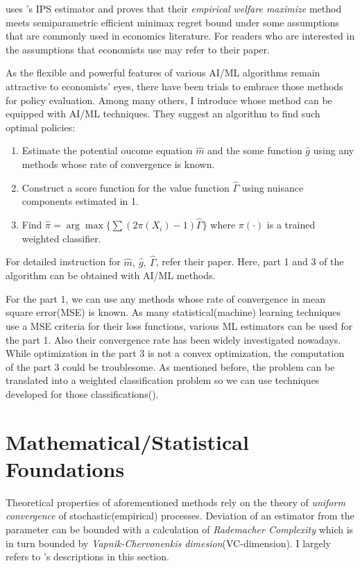 \documentclass[11pt]{article}
\begin{document}
	\cite{Kitagawa.2018} uses \cite{Dudik.2011}'s IPS estimator and proves that their \textit{empirical welfare maximize} method meets semiparametric efficient minimax regret bound under some assumptions that are commonly used in economics literature. For readers who are interested in the assumptions that economists use may refer to their paper.
	
	As the flexible and powerful features of various AI/ML algorithms remain attractive to economists' eyes, there have been trials to embrace those methods for policy evaluation. Among many others, I introduce \cite{Athey.2017txo}  whose method can be equipped with AI/ML techniques. They suggest an algorithm to find such optimal policies:
	\begin{enumerate}
		\item Estimate the potential oucome equation $\hat{m}$ and the some function $\hat{g}$ using any methods whose rate of convergence is known.
		\item Construct a score function for the value function $\hat{\Gamma}$ using nuisance components estimated in 1.
		\item Find $\hat{\pi} = \arg \max \{ \sum (2\pi(X_i)-1) \hat{\Gamma} \} $ where $\pi(\cdot)$ is a trained weighted classifier.
	\end{enumerate}
For detailed instruction for $\hat{m},~\hat{g},~\hat{\Gamma}$, refer their paper. Here, part 1 and 3 of the algorithm can be obtained with AI/ML methods.

For the part 1, we can use any methods whose rate of convergence in mean square error(MSE) is known. As many statistical(machine) learning techniques use a MSE criteria for their loss functions, various ML estimators can be used for the part 1. Also their convergence rate has been widely investigated nowadays. While optimization in the part 3 is not a convex optimization, the computation of the part 3 could be troublesome. As mentioned before, the problem can be translated into a weighted classification problem so we can use techniques developed for those classifications(\cite{Athey.2017txo}).
	
	\section{Mathematical/Statistical Foundations}

	Theoretical properties of aforementioned methods rely on the theory of \textit{uniform convergence} of stochastic(empirical) processes. Deviation of an estimator from the parameter can be bounded with a calculation of \textit{Rademacher Complexity} which is in turn bounded by \textit{Vapnik-Chervonenkis dimesion}(VC-dimension). I largely refers to \cite{wainwright2019high}'s descriptions in this section.
	
\end{document}
